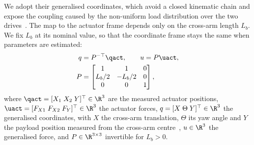 We adopt their generalised coordinates, which avoid a closed kinematic chain
and expose the coupling caused by the non-uniform load distribution over the
two drives~\cite[Sec.~2.2]{garcia2013model}.
The map to the actuator frame depends only on the cross-arm length $L_b$.
We fix $L_b$ at its nominal value, so that the coordinate frame stays the same
when parameters are estimated:
\begin{equation}
\begin{aligned}
  q &= P^{-\top}\qact,
  \qquad
  u = P\uact,\\
  P &=
  \begin{bmatrix}
    1 & 1 & 0\\
    L_b/2 & -L_b/2 & 0\\
    0 & 0 & 1
  \end{bmatrix},
\end{aligned}
\label{eq:Ptransform}
\end{equation}
where $\qact=[X_1\;X_2\;Y]^\top\in\R^3$ are the measured actuator positions,
$\uact=[F_{X1}\;F_{X2}\;F_Y]^\top\in\R^3$ the actuator forces,
$q=[X\;\Theta\;Y]^\top\in\R^3$ the generalised coordinates, with $X$ the
cross-arm translation, $\Theta$ its yaw angle and $Y$ the payload position
measured from the cross-arm centre~\cite[Sec.~2.2]{garcia2013model},
$u\in\R^3$ the generalised force, and $P\in\R^{3\times3}$ invertible for
$L_b>0$.


